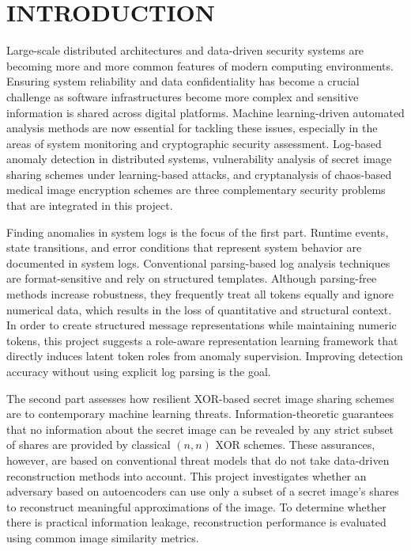 \chapter{INTRODUCTION}
\justifying

Large-scale distributed architectures and data-driven security systems are becoming more and more common features of modern computing environments. Ensuring system reliability and data confidentiality has become a crucial challenge as software infrastructures become more complex and sensitive information is shared across digital platforms. Machine learning-driven automated analysis methods are now essential for tackling these issues, especially in the areas of system monitoring and cryptographic security assessment. Log-based anomaly detection in distributed systems, vulnerability analysis of secret image sharing schemes under learning-based attacks, and cryptanalysis of chaos-based medical image encryption schemes are three complementary security problems that are integrated in this project.

Finding anomalies in system logs is the focus of the first part. Runtime events, state transitions, and error conditions that represent system behavior are documented in system logs. Conventional parsing-based log analysis techniques are format-sensitive and rely on structured templates. Although parsing-free methods increase robustness, they frequently treat all tokens equally and ignore numerical data, which results in the loss of quantitative and structural context. In order to create structured message representations while maintaining numeric tokens, this project suggests a role-aware representation learning framework that directly induces latent token roles from anomaly supervision. Improving detection accuracy without using explicit log parsing is the goal.

The second part assesses how resilient XOR-based secret image sharing schemes are to contemporary machine learning threats. Information-theoretic guarantees that no information about the secret image can be revealed by any strict subset of shares are provided by classical $(n, n)$ XOR schemes. These assurances, however, are based on conventional threat models that do not take data-driven reconstruction methods into account. This project investigates whether an adversary based on autoencoders can use only a subset of a secret image's shares to reconstruct meaningful approximations of the image. To determine whether there is practical information leakage, reconstruction performance is evaluated using common image similarity metrics.

